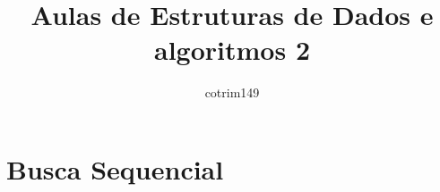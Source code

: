 \documentclass{article}
\title{Aulas de Estruturas de Dados e algoritmos 2}
\author{cotrim149}
\begin{document}
\maketitle

\section{Busca Sequencial}

	
\end{document}
